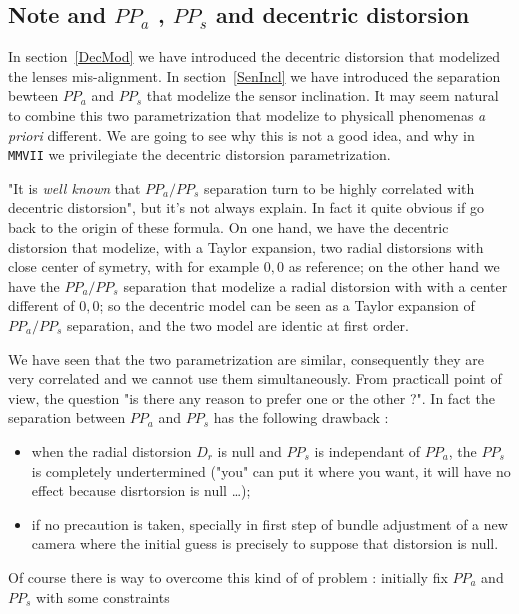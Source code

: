 \subsection{Note and $PP_a$ , $PP_s$ and decentric distorsion}
\label{PPA:PPS:DEC}

In section~\ref{DecMod} we have introduced the decentric distorsion that
modelized the lenses mis-alignment.  In  section~\ref{SenIncl}
we have introduced the separation bewteen $PP_a$ and $PP_s$ that modelize
the sensor inclination.  It may seem natural to combine this two
parametrization that modelize to physicall phenomenas \emph{a priori}
different. We are going to see why this is not a good idea, and why in
{\tt MMVII} we privilegiate the decentric distorsion parametrization.

"It is \emph{well known} that  $PP_a/PP_s$ separation turn to be highly
correlated with decentric distorsion", but it's not always explain. In fact
it quite obvious if go back to the origin of these formula.  On one hand, we have 
the decentric distorsion that modelize, with a Taylor expansion, two radial distorsions
with close center of symetry, with for example $0,0$ as reference;
on the other hand we have the $PP_a/PP_s$ separation that modelize 
a radial distorsion with with a center different of $0,0$; so the decentric model
can be seen as a Taylor expansion of $PP_a/PP_s$  separation, and the two model
are identic at first order.


We have seen that the two parametrization are similar, consequently they are
very correlated and we cannot use them simultaneously. From practicall point of view,
the question "is there any reason to prefer one or the other ?".
In fact the separation between $PP_a$ and $PP_s$ has the following drawback :

\begin{itemize}
   \item when the radial distorsion $D_r$ is null and $PP_s$ is independant of $PP_a$, the 
         $PP_s$ is completely undertermined ("you" can put it where you want, it will have no 
         effect because disrtorsion is null \dots);

   \item  if no precaution is taken, specially in first step of bundle adjustment 
          of a new camera where the initial guess is precisely to suppose that distorsion
          is null.
\end{itemize}

Of course there is way to overcome this kind of of problem : 
initially fix $PP_a$ and $PP_s$ with some constraints



